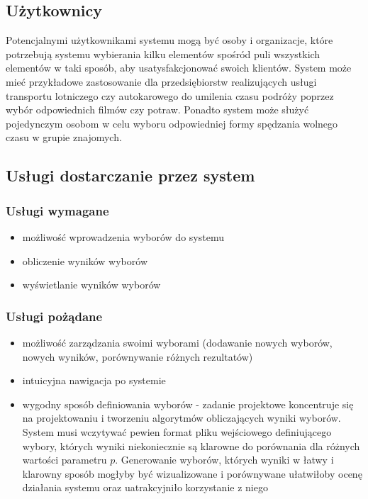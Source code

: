 \documentclass[polish,11pt]{aghthesis}
\begin{document}

\subsection{Użytkownicy}
Potencjalnymi użytkownikami systemu mogą być osoby i organizacje, które potrzebują
systemu wybierania kilku elementów spośród puli wszystkich elementów w taki sposób, aby
usatysfakcjonować swoich klientów. System może mieć przykładowe zastosowanie dla
przedsiębiorstw realizujących usługi transportu lotniczego czy autokarowego do umilenia
czasu podróży poprzez wybór odpowiednich filmów czy potraw. Ponadto system może
służyć pojedynczym osobom w celu wyboru odpowiedniej formy spędzania wolnego czasu w
grupie znajomych.


\subsection{Usługi dostarczanie przez system}

\subsubsection{Usługi wymagane}
\begin{itemize}
    \item możliwość wprowadzenia wyborów do systemu
    \item obliczenie wyników wyborów
    \item wyświetlanie wyników wyborów
\end{itemize}

\subsubsection{Usługi pożądane}
\begin{itemize}
    \item możliwość zarządzania swoimi wyborami (dodawanie nowych wyborów, nowych wyników, porównywanie różnych rezultatów)
    \item intuicyjna nawigacja po systemie
    \item wygodny sposób definiowania wyborów - zadanie projektowe koncentruje się na
projektowaniu i tworzeniu algorytmów obliczających wyniki wyborów. System musi
wczytywać pewien format pliku wejściowego definiującego wybory, których wyniki niekoniecznie są klarowne do porównania dla różnych wartości parametru $p$. Generowanie wyborów, których wyniki w łatwy i klarowny sposób mogłyby być wizualizowane i porównywane ułatwiłoby ocenę działania systemu oraz uatrakcyjniło korzystanie z niego
\end{itemize}
\end{document}
